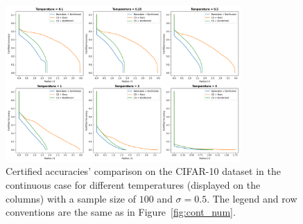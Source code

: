 \begin{figure}[htbp]
    \centering
    \includegraphics[width=0.8\textwidth]{images/cont_temp}
    \caption{Certified accuracies' comparison on the CIFAR-10 dataset in the continuous case for different temperatures (displayed on the columns) with a sample size of $100$ and $\sigma = 0.5$. The legend and row conventions are the same as in Figure~\ref{fig:cont_num}.}
    \label{fig:cont_temp}
\end{figure}

